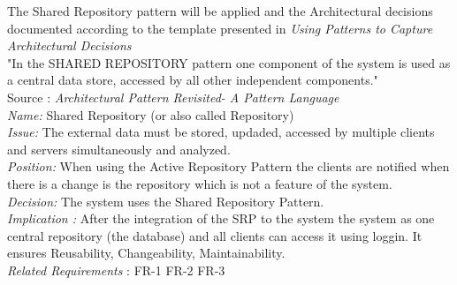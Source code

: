 The Shared Repository pattern will be applied and the Architectural decisions documented according to the template presented in \textit{Using Patterns to Capture Architectural Decisions} \\
 "In the SHARED REPOSITORY pattern one component of the system is used as a central data store, accessed by all other independent components."\\
Source : \textit{Architectural Pattern Revisited- A Pattern Language} \\
 \textit{Name:} Shared Repository (or also called Repository) \\
 \textit{Issue:} The external data must be stored, updaded, accessed by multiple clients and servers simultaneously and analyzed.\\
 \textit{Position:} When using the Active Repository Pattern the clients are notified when there is a change is the repository which is not a feature of the system.\\
 \textit{Decision: } The system uses the Shared Repository Pattern.\\
 \textit{Implication :} After the integration of the SRP to the system the system as one central repository (the database) and all clients can access it using loggin. It ensures Reusability, Changeability, Maintainability. \\
 \textit{Related Requirements} : FR-1 FR-2 FR-3 \\

 




